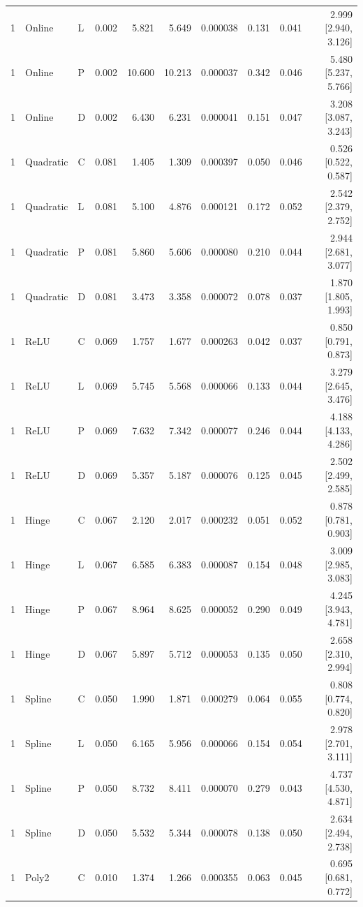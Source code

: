 \begin{longtable}{lllrrrrrrr}
1 & Online & L & 0.002 & 5.821 & 5.649 & 0.000038 & 0.131 & 0.041 & 2.999 [2.940, 3.126] \\
1 & Online & P & 0.002 & 10.600 & 10.213 & 0.000037 & 0.342 & 0.046 & 5.480 [5.237, 5.766] \\
1 & Online & D & 0.002 & 6.430 & 6.231 & 0.000041 & 0.151 & 0.047 & 3.208 [3.087, 3.243] \\
1 & Quadratic & C & 0.081 & 1.405 & 1.309 & 0.000397 & 0.050 & 0.046 & 0.526 [0.522, 0.587] \\
1 & Quadratic & L & 0.081 & 5.100 & 4.876 & 0.000121 & 0.172 & 0.052 & 2.542 [2.379, 2.752] \\
1 & Quadratic & P & 0.081 & 5.860 & 5.606 & 0.000080 & 0.210 & 0.044 & 2.944 [2.681, 3.077] \\
1 & Quadratic & D & 0.081 & 3.473 & 3.358 & 0.000072 & 0.078 & 0.037 & 1.870 [1.805, 1.993] \\
1 & ReLU & C & 0.069 & 1.757 & 1.677 & 0.000263 & 0.042 & 0.037 & 0.850 [0.791, 0.873] \\
1 & ReLU & L & 0.069 & 5.745 & 5.568 & 0.000066 & 0.133 & 0.044 & 3.279 [2.645, 3.476] \\
1 & ReLU & P & 0.069 & 7.632 & 7.342 & 0.000077 & 0.246 & 0.044 & 4.188 [4.133, 4.286] \\
1 & ReLU & D & 0.069 & 5.357 & 5.187 & 0.000076 & 0.125 & 0.045 & 2.502 [2.499, 2.585] \\
1 & Hinge & C & 0.067 & 2.120 & 2.017 & 0.000232 & 0.051 & 0.052 & 0.878 [0.781, 0.903] \\
1 & Hinge & L & 0.067 & 6.585 & 6.383 & 0.000087 & 0.154 & 0.048 & 3.009 [2.985, 3.083] \\
1 & Hinge & P & 0.067 & 8.964 & 8.625 & 0.000052 & 0.290 & 0.049 & 4.245 [3.943, 4.781] \\
1 & Hinge & D & 0.067 & 5.897 & 5.712 & 0.000053 & 0.135 & 0.050 & 2.658 [2.310, 2.994] \\
1 & Spline & C & 0.050 & 1.990 & 1.871 & 0.000279 & 0.064 & 0.055 & 0.808 [0.774, 0.820] \\
1 & Spline & L & 0.050 & 6.165 & 5.956 & 0.000066 & 0.154 & 0.054 & 2.978 [2.701, 3.111] \\
1 & Spline & P & 0.050 & 8.732 & 8.411 & 0.000070 & 0.279 & 0.043 & 4.737 [4.530, 4.871] \\
1 & Spline & D & 0.050 & 5.532 & 5.344 & 0.000078 & 0.138 & 0.050 & 2.634 [2.494, 2.738] \\
1 & Poly2 & C & 0.010 & 1.374 & 1.266 & 0.000355 & 0.063 & 0.045 & 0.695 [0.681, 0.772] \\

\end{longtable}
